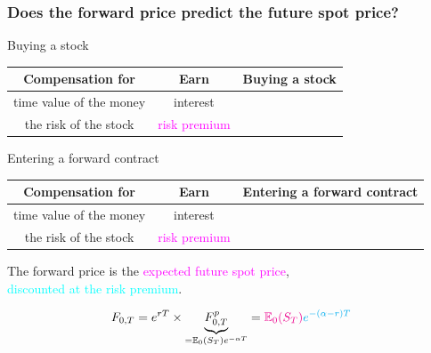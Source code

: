 \begin{frame}[fragile,t]
	\frametitle{Does the forward price predict the future spot price?}

	\begin{center}
		Buying a stock\\
		\bigskip

		\renewcommand{\arraystretch}{1.2}
		\begin{tabular}{|c|c|c|}
			\hline
			Compensation for        & Earn                              & Buying a stock \\ \hline
			time value of the money & interest                          & \cmark         \\
			the risk of the stock   & \textcolor{magenta}{risk premium} & \cmark         \\ \hline
		\end{tabular}

		\vfill
		\mySeparateLine
		\vfill

		Entering a forward contract \\
		\bigskip

		\renewcommand{\arraystretch}{1.2}
		\begin{tabular}{|c|c|c|}
			\hline
			Compensation for        & Earn                              & Entering a forward contract \\ \hline
			time value of the money & interest                          & \xmark                      \\
			the risk of the stock   & \textcolor{magenta}{risk premium} & \cmark                      \\ \hline
		\end{tabular}
		\bigskip
	\end{center}
\end{frame}
\begin{frame}[fragile,t]
\begin{center}
	The forward price is the \textcolor{magenta}{expected future spot price}, \\
	\textcolor{cyan}{discounted at the risk premium}.  \\
	\bigskip

	\begin{align*}
		F_{0,T} = e^{rT} \times \underbrace{F_{0,T}^p}_{=\mathbb{E}_0(S_T)e^{-\alpha T}} = \textcolor{magenta}{\mathbb{E}_0(S_T)}\textcolor{cyan}{e^{-(\alpha-r)T}}
	\end{align*}
\end{center}
\end{frame}
